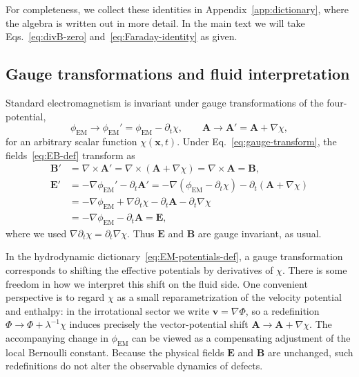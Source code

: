 \documentclass[11pt]{article}
\begin{document}
For completeness, we collect these identities in Appendix~\ref{app:dictionary}, where the algebra is written out in more detail.  In the main text we will take Eqs.~\eqref{eq:divB-zero} and~\eqref{eq:Faraday-identity} as given.

\subsection{Gauge transformations and fluid interpretation}

Standard electromagnetism is invariant under gauge transformations of the four-potential,
\begin{equation}
\phi_{\mathrm{EM}} \rightarrow \phi_{\mathrm{EM}}' = \phi_{\mathrm{EM}} - \partial_t \chi,
\qquad
\mathbf{A} \rightarrow \mathbf{A}' = \mathbf{A} + \nabla \chi,
\label{eq:gauge-transform}
\end{equation}
for an arbitrary scalar function $\chi(\mathbf{x},t)$.  Under Eq.~\eqref{eq:gauge-transform}, the fields~\eqref{eq:EB-def} transform as
\begin{align}
\mathbf{B}' &= \nabla \times \mathbf{A}'
            = \nabla \times (\mathbf{A} + \nabla \chi)
            = \nabla \times \mathbf{A}
            = \mathbf{B},
\\[4pt]
\mathbf{E}' &= -\nabla \phi_{\mathrm{EM}}' - \partial_t \mathbf{A}'
            = -\nabla(\phi_{\mathrm{EM}} - \partial_t \chi)
              - \partial_t(\mathbf{A} + \nabla \chi)
\nonumber\\
            &= -\nabla \phi_{\mathrm{EM}} + \nabla\partial_t \chi
              - \partial_t \mathbf{A} - \partial_t \nabla \chi
\nonumber\\
            &= -\nabla \phi_{\mathrm{EM}} - \partial_t \mathbf{A}
            = \mathbf{E},
\end{align}
where we used $\nabla\partial_t \chi = \partial_t \nabla \chi$.  Thus $\mathbf{E}$ and $\mathbf{B}$ are gauge invariant, as usual.

In the hydrodynamic dictionary~\eqref{eq:EM-potentials-def}, a gauge transformation corresponds to shifting the effective potentials by derivatives of $\chi$.  There is some freedom in how we interpret this shift on the fluid side.  One convenient perspective is to regard $\chi$ as a small reparametrization of the velocity potential and enthalpy:
in the irrotational sector we write $\mathbf{v} = \nabla \Phi$, so a redefinition $\Phi \rightarrow \Phi + \lambda^{-1}\chi$ induces precisely the vector-potential shift $\mathbf{A} \rightarrow \mathbf{A} + \nabla \chi$.  The accompanying change in $\phi_{\mathrm{EM}}$ can be viewed as a compensating adjustment of the local Bernoulli constant.  Because the physical fields $\mathbf{E}$ and $\mathbf{B}$ are unchanged, such redefinitions do not alter the observable dynamics of defects.
\end{document}
